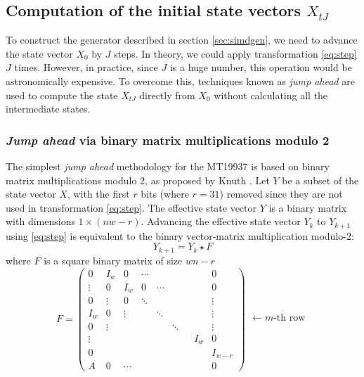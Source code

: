 \documentclass[preprint,1p,times]{elsarticle}
\begin{document}
\subsection{Computation of the initial state vectors $X_{tJ}$}
To construct the generator described in section \ref{sec:simdgen}, we need to advance the state vector $X_0$ by $J$ steps. In theory, we could apply transformation \eqref{eq:step} $J$ times. However, in practice, since $J$ is a huge number, this operation would be astronomically expensive. 
To overcome this, techniques known as \textit{jump ahead} are used to compute the state $X_{tJ}$ directly from $X_0$ without calculating all the intermediate states. \\
\subsubsection{\textit{Jump ahead} via binary matrix multiplications modulo 2}
\label{sec:jumpahead}
The simplest \textit{jump ahead} methodology for the MT19937 is based on binary matrix multiplications modulo 2, as proposed by Knuth \cite{knuth}. Let $Y$ be a subset of the state vector $X$, with the first $r$ bits (where $r = 31$) removed since they are not used in transformation \eqref{eq:step}. 
The effective state vector $Y$ is a binary matrix with dimensions $1\times (nw-r)$. Advancing the effective state vector $Y_k$ to $Y_{k+1}$ using \eqref{eq:step} is equivalent to the binary vector-matrix multiplication modulo-2:
\begin{equation}
Y_{k+1} = Y_k \star F
\end{equation}
where $F$ is a square binary matrix of size $wn-r$
\begin{equation}
\label{eq:transmat}
    F = \begin{pmatrix}
        0 & I_w & 0 & \cdots & &  &  &  & 0 \\
        \vdots & 0 & I_w & 0 & \cdots & & & & 0\\
        0 & \vdots & 0 & \ddots & &&& & \vdots \\
        I_w & 0 & \vdots & & \ddots & && & \vdots \\
        0 & \vdots &  & & & \ddots & & & \vdots \\
        \vdots &  &  &  & &&& I_w & 0 \\
        0 &  &  & &  & &&&I_{w - r} \\
        A & 0 & \cdots & &  &  &&& 0
\end{pmatrix}
\begin{matrix}
\\ \\ \\ \leftarrow m\text{-th row} \\ \\ \\ \\
\end{matrix}
\end{equation}
\end{document}
